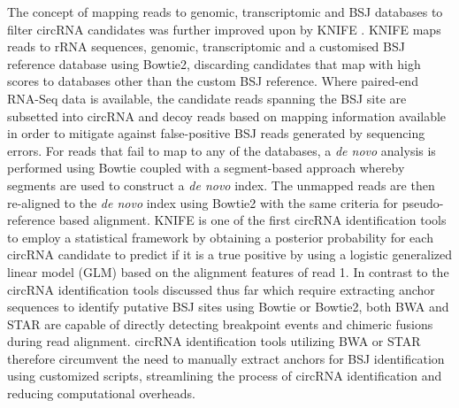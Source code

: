 \documentclass[journal,review,submit,pdftex,moreauthors]{Definitions/mdpi}
\begin{document}
The concept of mapping reads to genomic, transcriptomic and BSJ databases to filter circRNA candidates was further improved upon by KNIFE \cite{KNIFE}. KNIFE maps reads to rRNA sequences, genomic, transcriptomic and a customised BSJ reference database using Bowtie2, discarding candidates that map with high scores to databases other than the custom BSJ reference. Where paired-end RNA-Seq data is available, the candidate reads spanning the BSJ site are subsetted into circRNA and decoy reads based on mapping information available in order to mitigate against false-positive BSJ reads generated by sequencing errors. For reads that fail to map to any of the databases, a \textit{de novo} analysis is performed using Bowtie coupled with a segment-based approach whereby segments are used to construct a \textit{de novo} index. The unmapped reads are then re-aligned to the \textit{de novo} index using Bowtie2 with the same criteria for pseudo-reference based alignment. KNIFE is one of the first circRNA identification tools to employ a statistical framework by obtaining a posterior probability for each circRNA candidate to predict if it is a true positive by using a logistic generalized linear model (GLM) based on the alignment features of read 1. In contrast to the circRNA identification tools discussed thus far which require extracting anchor sequences to identify putative BSJ sites using Bowtie or Bowtie2, both BWA and STAR are capable of directly detecting breakpoint events and chimeric fusions during read alignment. circRNA identification tools utilizing BWA or STAR therefore circumvent the need to manually extract anchors for BSJ identification using customized scripts, streamlining the process of circRNA identification and reducing computational overheads. \par 
\end{document}
